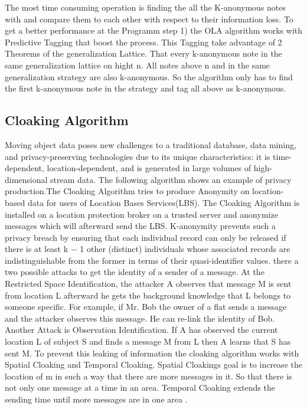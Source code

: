 \documentclass{llncs}
\begin{document}
The most time consuming operation is finding the all the K-anonymous notes with and compare them to each other with respect to their information loss.  To get a better performance at the Programm step 1) the OLA algorithm works with Predictive Tagging that boost the process.  This Tagging take advantage of 2 Theorems of the generalization Lattice. That every k-anonymous note in the same generalization lattice on hight n. All notes above n and in the same generalization strategy are also k-anonymous. So the algorithm only has to find the first k-anonymous note in the strategy and tag all above as k-anonymous.   

\subsection{Cloaking Algorithm}
Moving object data poses new challenges to a traditional database, data mining, and privacy-preserving technologies due to its unique characteristics: it is time-dependent, location-dependent, and is generated in large volumes of high-dimensional stream data. The following algorithm shows an example of privacy production.The Cloaking Algorithm tries to produce Anonymity on location-based data for users of Location Bases Services(LBS). The Cloaking Algorithm is installed on a location protection broker on a trusted server and anonymize messages which will afterward send the LBS. K-anonymity prevents such a privacy breach by ensuring that each individual record can only be released if there is at least k − 1 other (distinct) individuals whose associated records are indistinguishable from the former in terms of their quasi-identifier values. there a two possible attacks to get the identity of a sender of a message. At the  Restricted Space Identification, the attacker A observes that message M is sent from location L afterward he gets the background knowledge that L belongs to someone specific. For example, if Mr. Bob the owner of a flat sends a message and the attacker observes this message. He can re-link the identity of Bob. Another Attack is  Observation Identiﬁcation. If A has observed the current location L of subject S and ﬁnds a message M from L then A learns that S has sent M.  To prevent this leaking of information the cloaking algorithm works with Spatial Cloaking and Temporal Cloaking. Spatial Cloakings goal is to increase the location of m in such a way that there are more messages in it. So that there is not only one message at a time in an area. Temporal Cloaking extends the sending time until more messages are in one area \cite{gedik2004customizable}. 
\end{document}

